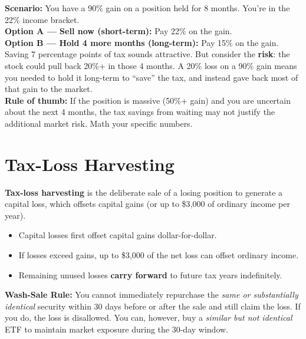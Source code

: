 \documentclass[11pt, letterpaper]{article}
\begin{document}
\begin{tcolorbox}[colback=part5bg, colframe=sectionteal,
  title={\bfseries Strategic Decision: When to Sell a Big Gain}, arc=3pt, boxrule=1pt]
\textbf{Scenario:} You have a 90\% gain on a position held for 8 months. You're in the 22\% income bracket.\\[4pt]
\textbf{Option A --- Sell now (short-term):} Pay 22\% on the gain.\\
\textbf{Option B --- Hold 4 more months (long-term):} Pay 15\% on the gain.\\[4pt]
Saving 7 percentage points of tax sounds attractive. But consider the \textbf{risk}: the stock could pull back 20\%+ in those 4 months. A 20\% loss on a 90\% gain means you needed to hold it long-term to ``save'' the tax, and instead gave back most of that gain to the market. \\[4pt]
\textbf{Rule of thumb:} If the position is massive (50\%+ gain) and you are uncertain about the next 4 months, the tax savings from waiting may not justify the additional market risk. Math your specific numbers.
\end{tcolorbox}

\section*{Tax-Loss Harvesting}

\textbf{Tax-loss harvesting} is the deliberate sale of a losing position to generate a capital loss, which offsets capital gains (or up to \$3{,}000 of ordinary income per year).

\begin{itemize}[noitemsep]
  \item Capital losses first offset capital gains dollar-for-dollar.
  \item If losses exceed gains, up to \$3{,}000 of the net loss can offset ordinary income.
  \item Remaining unused losses \textbf{carry forward} to future tax years indefinitely.
\end{itemize}

\textbf{Wash-Sale Rule:} You cannot immediately repurchase the \emph{same or substantially identical} security within 30 days before or after the sale and still claim the loss. If you do, the loss is disallowed. You can, however, buy a \emph{similar but not identical} ETF to maintain market exposure during the 30-day window.
\end{document}
